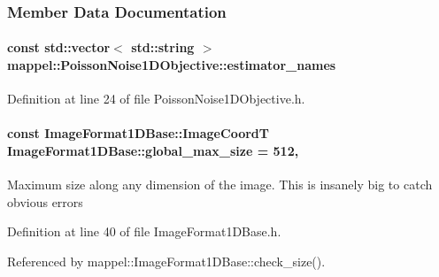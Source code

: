 \subsubsection{Member Data Documentation}
\paragraph[{\texorpdfstring{estimator\+\_\+names}{estimator_names}}]{\setlength{\rightskip}{0pt plus 5cm}const std\+::vector$<$ std\+::string $>$ mappel\+::\+Poisson\+Noise1\+D\+Objective\+::estimator\+\_\+names\hspace{0.3cm}{\ttfamily [static]}}\hypertarget{classmappel_1_1PoissonNoise1DObjective_a985200133fb3e5bfdf8755296cf700eb}{}\label{classmappel_1_1PoissonNoise1DObjective_a985200133fb3e5bfdf8755296cf700eb}


Definition at line 24 of file Poisson\+Noise1\+D\+Objective.\+h.

\paragraph[{\texorpdfstring{global\+\_\+max\+\_\+size}{global_max_size}}]{\setlength{\rightskip}{0pt plus 5cm}const {\bf Image\+Format1\+D\+Base\+::\+Image\+CoordT} Image\+Format1\+D\+Base\+::global\+\_\+max\+\_\+size = 512\hspace{0.3cm}{\ttfamily [static]}, {\ttfamily [inherited]}}\hypertarget{classmappel_1_1ImageFormat1DBase_a5aafad20e635eae6f3609af56abad3ad}{}\label{classmappel_1_1ImageFormat1DBase_a5aafad20e635eae6f3609af56abad3ad}
Maximum size along any dimension of the image. This is insanely big to catch obvious errors 

Definition at line 40 of file Image\+Format1\+D\+Base.\+h.



Referenced by mappel\+::\+Image\+Format1\+D\+Base\+::check\+\_\+size().

